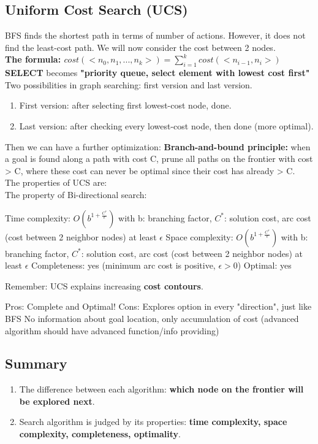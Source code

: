 \subsection{Uniform Cost Search (UCS)}
BFS finds the shortest path in terms of number of actions. However, it does not find the least-cost path. We will now consider the cost between 2 nodes. \\
\textbf{The formula: $cost(<n_{0},n_{1},...,n_{k}>) = \sum_{i=1}^{k} cost(<n_{i-1},n_{i}>)$} \\
\textbf{SELECT} becomes \textbf{"priority queue, select element with lowest cost first"} \\
Two possibilities in graph searching: first version and last version.
\begin{enumerate}
    \item First version: after selecting first lowest-cost node, done.
    \item Last version: after checking every lowest-cost node, then done (more optimal).
\end{enumerate}

\noindent
Then we can have a further optimization: \textbf{Branch-and-bound principle:} when a goal is found along a path with cost C, prune all paths on the frontier with cost > C, where these cost can never be optimal since their cost has already > C. \\
The properties of UCS are: \\
The property of Bi-directional search:
\begin{outline}
    \1 Time complexity: $O(b^{1+\frac{C^{*}}{\epsilon}})$
        \2 with b: branching factor, $C^{*}$: solution cost, arc cost (cost between 2 neighbor nodes) at least $\epsilon$
    \1 Space complexity: $O(b^{1+\frac{C^{*}}{\epsilon}})$
        \2 with b: branching factor, $C^{*}$: solution cost, arc cost (cost between 2 neighbor nodes) at least $\epsilon$
    \1 Completeness: yes (minimum arc cost is positive, $\epsilon > 0$)
    \1 Optimal: yes
\end{outline}

Remember: UCS explains increasing \textbf{cost contours}.
\begin{outline}
    \1 Pros:
        \2 Complete and Optimal!
    \1 Cons:
        \2 Explores option in every "direction", just like BFS
        \2 No information about goal location, only accumulation of cost (advanced algorithm should have advanced function/info providing)
\end{outline}

\subsection{Summary}
\begin{enumerate}
    \item The difference between each algorithm: \textbf{which node on the frontier will be explored next}.
    \item Search algorithm is judged by its properties: \textbf{time complexity, space complexity, completeness, optimality}.
\end{enumerate}

\pagebreak